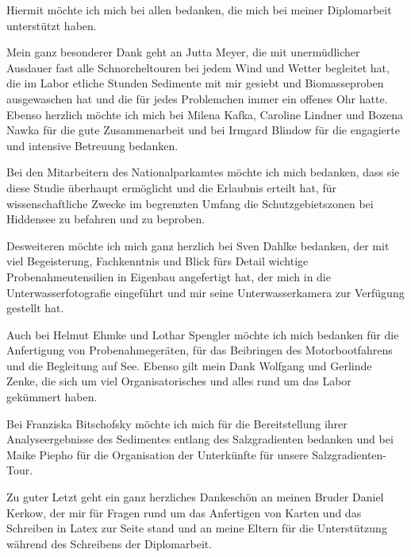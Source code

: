 Hiermit möchte ich mich bei allen bedanken, die mich bei meiner Diplomarbeit unterstützt haben.

Mein ganz besonderer Dank geht an Jutta Meyer, die mit unermüdlicher Ausdauer fast alle Schnorcheltouren bei jedem Wind und Wetter begleitet hat, die im Labor etliche Stunden Sedimente mit mir gesiebt und Biomasseproben ausgewaschen hat und die für jedes Problemchen immer ein offenes Ohr hatte. Ebenso herzlich möchte ich mich bei Milena Kafka, Caroline Lindner und Bozena Nawka für die gute Zusammenarbeit und bei Irmgard Blindow für die engagierte und intensive Betreuung bedanken.

Bei den Mitarbeitern des Nationalparkamtes möchte ich mich bedanken, dass sie diese Studie überhaupt ermöglicht und die Erlaubnis erteilt hat, für wissenschaftliche Zwecke im begrenzten Umfang die Schutzgebietszonen bei Hiddensee zu befahren und zu beproben.

Desweiteren möchte ich mich ganz herzlich bei Sven Dahlke bedanken, der mit viel Begeisterung, Fachkenntnis und Blick fürs Detail wichtige Probenahmeutensilien in Eigenbau angefertigt hat, der mich in die Unterwasserfotografie eingeführt und mir seine Unterwasserkamera zur Verfügung gestellt hat.

Auch bei Helmut Ehmke und Lothar Spengler möchte ich mich bedanken für die Anfertigung von Probenahmegeräten, für das Beibringen des Motorbootfahrens und die Begleitung auf See. Ebenso gilt mein Dank Wolfgang und Gerlinde Zenke, die sich um viel Organisatorisches und alles rund um das Labor gekümmert haben.

Bei Franziska Bitschofsky möchte ich mich für die Bereitstellung ihrer Analyseergebnisse des Sedimentes entlang des Salzgradienten bedanken und bei Maike Piepho für die Organisation der Unterkünfte für unsere Salzgradienten-Tour.

Zu guter Letzt geht ein ganz herzliches Dankeschön an meinen Bruder Daniel Kerkow, der mir für Fragen rund um das Anfertigen von Karten und das Schreiben in Latex zur Seite stand und an meine Eltern für die Unterstützung während des Schreibens der Diplomarbeit.